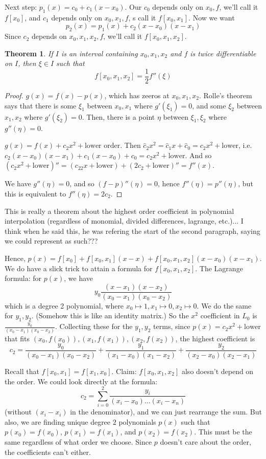 \documentclass{article}
\theoremstyle{plain}
\newtheorem{theorem}{Theorem}
\theoremstyle{remark}
\begin{document}
Next step: $p_1(x) = c_0 + c_1(x-x_0)$.
Our $c_0$ depends only on $x_0,f$, we'll call it $f[x_0]$,
and $c_1$ depends only on $x_0,x_1,f$, s call it $f[x_0,x_1]$.
Now we want
\[
	p_2(x) = p_1(x) + c_2(x-x_0)(x-x_1)
\]
Since $c_2$ depends on $x_0,x_1,x_2,f$, we'll call it $f[x_0,x_1,x_2]$.
\begin{theorem}
	If $I$ is an interval containing $x_0,x_1,x_2$ and $f$ is twice differentiable on $I$,
	then $\xi \in I$ such that
	\[
		f[x_0,x_1,x_2] = \frac12 f''(\xi)
	\]
\end{theorem}
\begin{proof}
	$g(x) = f(x) - p(x)$, which has zeeros at $x_0,x_1,x_2$.
	Rolle's theorem says that there is some $\xi_1$ between $x_0,x_1$
	where $g'(\xi_1) = 0$,
	and some $\xi_2$ between $x_1,x_2$ where $g'(\xi_2) = 0$.
	Then, there is a point $\eta$ between $\xi_1,\xi_2$ where $g''(\eta)= 0$.

	$g(x) = f(x) + c_2x^2 + \text{lower order}$.
	Then $\hat{c}_2x^2 = \hat{c}_1x + \hat{c}_0 = c_2x^2 + \text{lower}$,
	i.e. $c_2(x-x_0)(x-x_1) + c_1(x-x_0) + c_0 = c_2x^2 + \text{lower}$.
	And so $(c_2x^2 + \text{lower})'' = (c_22x + \text{lower}) + (2c_2 + \text{lower})'' = f''(x)$.

	We have $g''(\eta) = 0$, and so $(f-p)''(\eta) = 0$,
	hence $f''(\eta) = p''(\eta)$, but this is equivalent to $f''(\eta) = 2c_2$.
\end{proof}
This is really a theorem about the highest order coefficient
in polynomial interpolation
(regardless of monomial, divided differences, lagrange, etc.)...
I think when he said this, he was refering the start of the second paragraph,
saying we could represent as such???

Hence, $p(x) = f[x_0] + f[x_0,x_1](x-x) + f[x_0,x_1,x_2](x-x_0)(x-x_1)$.
We do have a slick trick to attain a formula for $f[x_0,x_1,x_2]$.
The Lagrange formula: for $p(x)$, we have
\[
	y_0\frac{(x-x_1)(x-x_2)}{(x_0-x_1)(x_0-x_2)}
\]
which is a degree 2 polynomial, where $x_0 \mapsto 1, x_1 \mapsto 0, x_2 \mapsto 0$.
We do the same for $y_1,y_2$.
(Somehow this is like an identity matrix.)
So the $x^2$ coefficient in $L_0$ is $\frac{y_0}{(x_0-x_1)(x_0-x_2)}$.
Collecting these for the $y_1,y_2$ terms,
since $p(x) = c_2x^2 + \text{lower}$ that fits $(x_0,f(x_0)),(x_1,f(x_1)),(x_2,f(x_2))$,
the highest coefficient is
\[
	c_2 = 
	\frac{y_0}{(x_0-x_1)(x_0-x_2)} +
	\frac{y_1}{(x_1-x_0)(x_1-x_2)} +
	\frac{y_2}{(x_2-x_0)(x_2-x_1)}
\]

Recall that $f[x_0,x_1] = f[x_1,x_0]$.
Claim: $f[x_0,x_1,x_2]$ also doesn't depend on the order.
We could look directly at the formula:
\[
	c_2 = \sum_{i=0}^2 \frac{y_i}{(x_i-x_0)\dots(x_i-x_n)}
\]
(without $(x_i-x_i)$ in the denominator),
and we can just rearrange the sum.
But also, we are finding unique degree $2$ polynomials $p(x)$
such that $p(x_0) = f(x_0)$, $p(x_1) = f(x_1)$, and $p(x_2) = f(x_2)$.
This must be the same regardless of what order we choose.
Since $p$ doesn't care about the order, the coefficients can't either.
\end{document}
